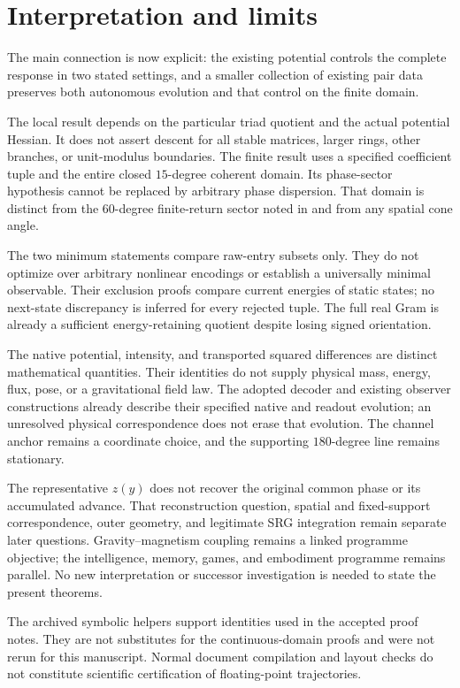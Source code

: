 \section{Interpretation and limits}\label{sec:limits}

The main connection is now explicit: the existing potential controls the complete response in two stated settings, and a smaller collection of existing pair data preserves both autonomous evolution and that control on the finite domain.

The local result depends on the particular triad quotient and the actual potential Hessian. It does not assert descent for all stable matrices, larger rings, other branches, or unit-modulus boundaries. The finite result uses a specified coefficient tuple and the entire closed \(15\)-degree coherent domain. Its phase-sector hypothesis cannot be replaced by arbitrary phase dispersion. That domain is distinct from the \(60\)-degree finite-return sector noted in \cite[Section~8]{energy} and from any spatial cone angle.

The two minimum statements compare raw-entry subsets only. They do not optimize over arbitrary nonlinear encodings or establish a universally minimal observable. Their exclusion proofs compare current energies of static states; no next-state discrepancy is inferred for every rejected tuple. The full real Gram is already a sufficient energy-retaining quotient despite losing signed orientation.

The native potential, intensity, and transported squared differences are distinct mathematical quantities. Their identities do not supply physical mass, energy, flux, pose, or a gravitational field law. The adopted decoder and existing observer constructions already describe their specified native and readout evolution; an unresolved physical correspondence does not erase that evolution. The channel anchor remains a coordinate choice, and the supporting \(180\)-degree line remains stationary.

The representative \(z(y)\) does not recover the original common phase or its accumulated advance. That reconstruction question, spatial and fixed-support correspondence, outer geometry, and legitimate SRG integration remain separate later questions. Gravity--magnetism coupling remains a linked programme objective; the intelligence, memory, games, and embodiment programme remains parallel. No new interpretation or successor investigation is needed to state the present theorems.

The archived symbolic helpers support identities used in the accepted proof notes. They are not substitutes for the continuous-domain proofs and were not rerun for this manuscript. Normal document compilation and layout checks do not constitute scientific certification of floating-point trajectories.
